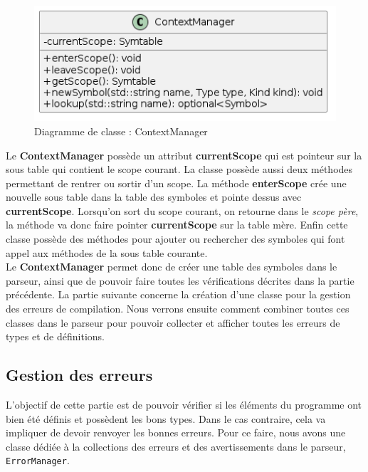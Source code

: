 \documentclass[a4paper]{article}%
\begin{document}
\begin{figure}[h!]
  \begin{center}
  \includegraphics[scale=0.5]{../ressources/diagrams/contextManager.png}
  \caption{Diagramme de classe : ContextManager}
  \end{center}
\end{figure}

Le \textbf{ContextManager} possède un attribut \textbf{currentScope} qui est pointeur sur
la sous table qui contient le scope courant. La classe possède aussi deux
méthodes permettant de rentrer ou sortir d'un scope. La méthode
\textbf{enterScope} crée une nouvelle sous table dans la table des symboles et
pointe dessus avec \textbf{currentScope}. Lorsqu'on sort du scope courant, on
retourne dans le \textit{scope père}, la méthode va donc faire pointer
\textbf{currentScope} sur la table mère. Enfin cette classe possède des méthodes
pour ajouter ou rechercher des symboles qui font appel aux méthodes de la sous
table courante.\\

Le \textbf{ContextManager} permet donc de créer une table des symboles dans le
parseur, ainsi que de pouvoir faire toutes les vérifications décrites dans la
partie précédente. La partie suivante concerne la création d'une classe pour la
gestion des erreurs de compilation. Nous verrons ensuite comment combiner toutes
ces classes dans le parseur pour pouvoir collecter et afficher toutes les
erreurs de types et de définitions.

\subsection{Gestion des erreurs}

L'objectif de cette partie est de pouvoir vérifier si les éléments du programme
ont bien été définis et possèdent les bons types. Dans le cas contraire, cela va
impliquer de devoir renvoyer les bonnes erreurs. Pour ce faire, nous avons une
classe dédiée à la collections des erreurs et des avertissements dans le
parseur, \lstinline{ErrorManager}.
\end{document}
